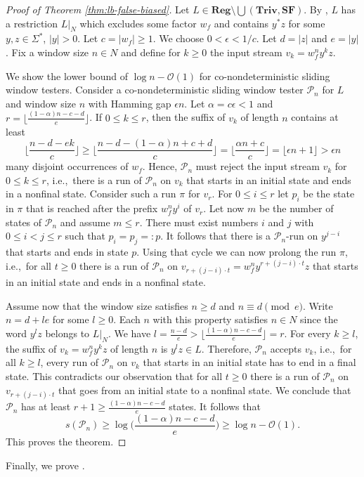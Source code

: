 \documentclass{theoretics}
\renewcommand{\O}{\mathcal{O}}
\renewcommand{\P}{\mathcal{P}}
\newcommand{\Reg}{\mathbf{Reg}}
\newcommand{\Triv}{\mathbf{Triv}}
\newcommand{\SF}{\mathbf{SF}}
\renewcommand{\geq}{\geqslant}
\renewcommand{\leq}{\leqslant}
\renewcommand{\ge}{\geq}
\renewcommand{\le}{\leq}
\begin{document}
\begin{proof}[Proof of Theorem \ref{thm:lb-false-biased}]
Let $L \in \Reg \setminus \bigcup(\Triv, \SF)$.
By , $L$ has a restriction $L|_N$ which excludes some factor $w_f$
and contains $y^*z$ for some $y,z \in \Sigma^*$, $|y| > 0$.
Let $c = |w_f| \geq 1$. We choose $0 < \epsilon < 1/c$.
Let $d = |z|$ and $e = |y|$.
Fix a window size $n\in N$ and 
define for $k \geq 0$ the input stream 
$v_k = w_f^n y^k z$.

We show the  lower bound of $\log n - \O(1)$  for co-nondeterministic sliding window testers.
Consider a co-nondeterministic sliding window tester $\P_n$ for $L$ and window size $n$ with Hamming gap $\epsilon n$.
Let $\alpha = c \epsilon < 1$ and $r= \lfloor \frac{(1-\alpha) n - c - d}{e} \rfloor$.
If $0 \le k \le r$, then the suffix of $v_k$ of length $n$  contains at least
\[
\bigg\lfloor\frac{n - d - e k}{c} \bigg\rfloor \geq 
\bigg\lfloor\frac{n - d - (1-\alpha) n + c + d}{c} \bigg\rfloor = 
\bigg\lfloor\frac{\alpha n + c}{c} \bigg\rfloor = \lfloor \epsilon n + 1 \rfloor  > \epsilon n
\]
many disjoint occurrences of $w_f$.
Hence, $\P_n$ must reject the input stream $v_k$ for $0 \le k \le r$,
i.e.,~there is a run of $\P_n$ on $v_k$ 
that starts in an initial state and ends in a nonfinal state.
Consider such a run $\pi$ for $v_r$.
For $0 \leq i \leq r$ let $p_i$ be the state in $\pi$ that is reached after the prefix $w_f^n y^i$ of $v_r$.
Let now $m$ be the number of states of $\P_n$ and assume $m\le r$.
There must exist numbers $i$ and $j$ with $0 \leq i < j \leq r$
such that $p_i = p_j =: p$.
It follows that there is a $\P_n$-run on $y^{j-i}$ that starts and ends in state $p$.
Using that cycle we can now prolong the run $\pi$,
i.e.,~for all $t\ge 0$ there is a run of $\P_n$ on $v_{r+(j-i)\cdot t}=w_f^n y^{r+(j-i)\cdot t}z$ 
that starts in an initial state and ends in a nonfinal state.

Assume now that the window size satisfies $n \geq d$ and $n \equiv d \pmod e$. Write $n = d + l e$ for some $l \geq 0$.
Each $n$ with this property satisfies $n\in N$ since the word $y^lz$ belongs to $L|_N$.
We have $l  = \frac{n-d}{e} > \lfloor \frac{(1-\alpha) n - c - d}{e} \rfloor = r$. For every $k \ge l$,
the suffix of $v_k = w_f^n y^k z$ of length $n$ is $y^l z \in L$.
Therefore, $\P_n$ accepts $v_k$, i.e.,~for all $k\ge l$,
every run of $\P_n$ on $v_k$ that starts in an initial state has to end in a final state.
This contradicts our observation that for all $t\ge 0$ there is a run of $\P_n$ on $v_{r+(j-i)\cdot t}$ that goes from an initial state to a 
nonfinal state. We conclude that $\P_n$ has at least $r+1 \geq \frac{(1-\alpha) n - c - d}{e}$ states.
It follows that 
\[
s(\P_n) \geq  \log \bigg( \frac{(1-\alpha) n - c - d}{e} \bigg) \geq \log n - \O(1).
\]
This proves the theorem.
\end{proof}
Finally, we prove .
\end{document}
